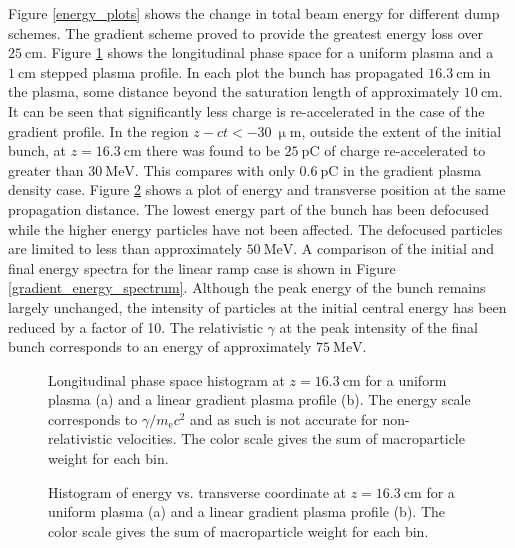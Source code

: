 \documentclass[aip,pop,preprint,superscriptaddress]{revtex4-1}
\begin{document}
Figure \ref{energy_plots} shows the change in total beam energy for different dump schemes. The gradient scheme proved to provide the greatest energy loss over $25 {\mathrm{\ cm}}$. Figure \ref{longPhaseSpaceComparison} shows the longitudinal phase space for a uniform plasma and a $1\mathrm{\ cm}$ stepped plasma profile. In each plot the bunch has propagated $16.3{\mathrm{\ cm}}$ in the plasma, some distance beyond the saturation length of approximately $10\mathrm{\ cm}$. It can be seen that significantly less charge is re-accelerated in the case of the gradient profile. In the region $z-ct<-30{\mathrm{\ \upmu m}}$, outside the extent of the initial bunch, at $z=16.3{\mathrm{\ cm}}$ there was found to be $25{\mathrm{\ pC}}$ of charge re-accelerated to greater than $30{\mathrm{\ MeV}}$. This compares with only $0.6{\mathrm{\ pC}}$ in the gradient plasma density case. Figure \ref{transPhaseSpaceComparison} shows a plot of energy and transverse position at the same propagation distance. The lowest energy part of the bunch has been defocused while the higher energy particles have not been affected. The defocused particles are limited to less than approximately $50\mathrm{\ MeV}$. A comparison of the initial and final energy spectra for the linear ramp case is shown in Figure \ref{gradient_energy_spectrum}. Although the peak energy of the bunch remains largely unchanged, the intensity of particles at the initial central energy has been reduced by a factor of 10. The relativistic $\gamma$ at the peak intensity of the final bunch corresponds to an energy of approximately $75\mathrm{\ MeV}$.
\begin{figure}[htb]
  \centering
  \caption{Longitudinal phase space histogram at $z=16.3{\mathrm{\ cm}}$ for a uniform plasma (a) and a linear gradient plasma profile (b). The energy scale corresponds to $\gamma/{m_{\mathrm{e}}c^2}$ and as such is not accurate for non-relativistic velocities. The color scale gives the sum of macroparticle weight for each bin.}
  \label{longPhaseSpaceComparison}
\end{figure}

\begin{figure}[htb]
  \centering
  \caption{Histogram of energy vs. transverse coordinate at $z=16.3{\mathrm{\ cm}}$ for a uniform plasma (a) and a linear gradient plasma profile (b). The color scale gives the sum of macroparticle weight for each bin.}
  \label{transPhaseSpaceComparison}
\end{figure}
\end{document}
